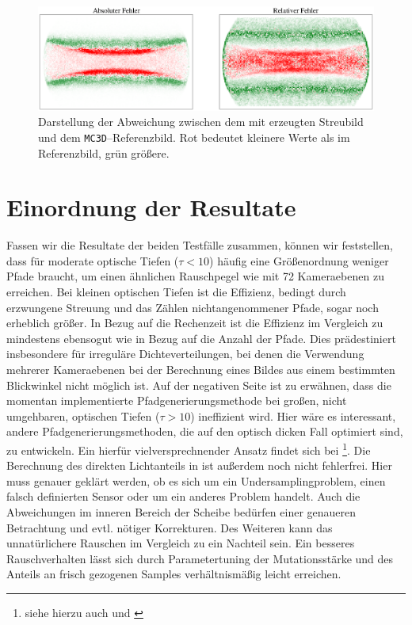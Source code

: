 		\begin{figure}
			\centering
			\includegraphics[width=1.0\textwidth]{resdiskplot.eps}
			\caption{Darstellung der Abweichung zwischen dem mit \pirate erzeugten Streubild und dem \texttt{MC3D}--Referenzbild. Rot bedeutet kleinere Werte als im Referenzbild, grün größere.}
			\label{fig:resdiskplot}
		\end{figure}
	

	\section{Einordnung der Resultate}
	Fassen wir die Resultate der beiden Testfälle zusammen, können wir feststellen, dass \pirate für moderate optische Tiefen ($\tau < 10$) häufig eine Größenordnung weniger Pfade braucht, um einen ähnlichen Rauschpegel wie \mctd mit 72 Kameraebenen zu erreichen. Bei kleinen optischen Tiefen ist die Effizienz, bedingt durch erzwungene Streuung und das Zählen nichtangenommener Pfade, sogar noch erheblich größer. In Bezug auf die Rechenzeit ist die Effizienz im Vergleich zu \mctd mindestens ebensogut wie in Bezug auf die Anzahl der Pfade. Dies prädestiniert \pirate insbesondere für irreguläre Dichteverteilungen, bei denen die Verwendung mehrerer Kameraebenen bei der Berechnung eines Bildes aus einem bestimmten Blickwinkel nicht möglich ist. Auf der negativen Seite ist zu erwähnen, dass die momentan implementierte Pfadgenerierungsmethode bei großen, nicht umgehbaren, optischen Tiefen ($\tau>10$) ineffizient wird. Hier wäre es interessant, andere Pfadgenerierungsmethoden, die auf den optisch dicken Fall optimiert sind, zu entwickeln. Ein hierfür vielversprechnender Ansatz findet sich bei \citet{Laszlo:2005p11056}\footnote{siehe hierzu auch \citep{DAldous:1994p11528} und \citep{Grassberger:2002p10876}}. Die Berechnung des direkten Lichtanteils in \pirate ist außerdem noch nicht fehlerfrei. Hier muss genauer geklärt werden, ob es sich um ein Undersamplingproblem, einen falsch definierten Sensor oder um ein anderes Problem handelt. Auch die Abweichungen im inneren Bereich der Scheibe bedürfen einer genaueren Betrachtung und evtl. nötiger Korrekturen. Des Weiteren kann das unnatürlichere Rauschen im Vergleich zu \mctd ein Nachteil sein. Ein besseres Rauschverhalten lässt sich durch Parametertuning der Mutationsstärke und des Anteils an frisch gezogenen Samples verhältnismäßig leicht erreichen.
	
